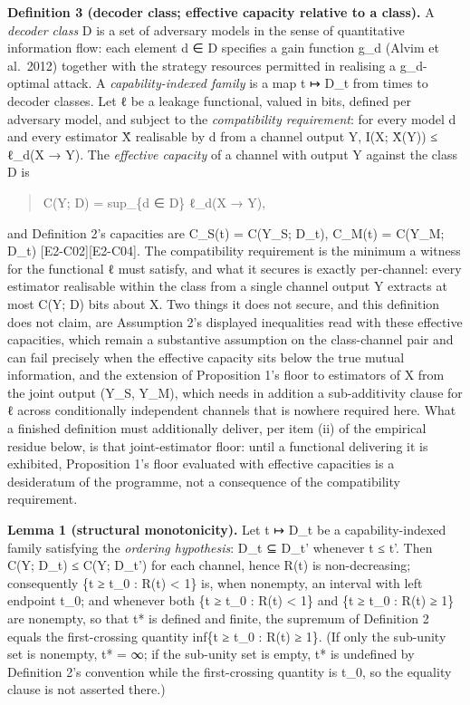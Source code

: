 \documentclass[
  11pt,
]{article}
\begin{document}
\textbf{Definition 3 (decoder class; effective capacity relative to a
class).} A \emph{decoder class} D is a set of adversary models in the
sense of quantitative information flow: each element d ∈ D specifies a
gain function g\_d (Alvim et al.~2012) together with the strategy
resources permitted in realising a g\_d-optimal attack. A
\emph{capability-indexed family} is a map t ↦ D\_t from times to decoder
classes. Let ℓ be a leakage functional, valued in bits, defined per
adversary model, and subject to the \emph{compatibility requirement}:
for every model d and every estimator X̂ realisable by d from a channel
output Y, I(X; X̂(Y)) ≤ ℓ\_d(X → Y). The \emph{effective capacity} of a
channel with output Y against the class D is

\begin{quote}
C(Y; D) = sup\_\{d ∈ D\} ℓ\_d(X → Y),
\end{quote}

and Definition 2's capacities are C\_S(t) = C(Y\_S; D\_t), C\_M(t) =
C(Y\_M; D\_t) {[}E2-C02{]}{[}E2-C04{]}. The compatibility requirement is
the minimum a witness for the functional ℓ must satisfy, and what it
secures is exactly per-channel: every estimator realisable within the
class from a single channel output Y extracts at most C(Y; D) bits about
X. Two things it does not secure, and this definition does not claim,
are Assumption 2's displayed inequalities read with these effective
capacities, which remain a substantive assumption on the class-channel
pair and can fail precisely when the effective capacity sits below the
true mutual information, and the extension of Proposition 1's floor to
estimators of X from the joint output (Y\_S, Y\_M), which needs in
addition a sub-additivity clause for ℓ across conditionally independent
channels that is nowhere required here. What a finished definition must
additionally deliver, per item (ii) of the empirical residue below, is
that joint-estimator floor: until a functional delivering it is
exhibited, Proposition 1's floor evaluated with effective capacities is
a desideratum of the programme, not a consequence of the compatibility
requirement.

\textbf{Lemma 1 (structural monotonicity).} Let t ↦ D\_t be a
capability-indexed family satisfying the \emph{ordering hypothesis}:
D\_t ⊆ D\_t' whenever t ≤ t'. Then C(Y; D\_t) ≤ C(Y; D\_t') for each
channel, hence R(t) is non-decreasing; consequently \{t ≥ t\_0 : R(t)
\textless{} 1\} is, when nonempty, an interval with left endpoint t\_0;
and whenever both \{t ≥ t\_0 : R(t) \textless{} 1\} and \{t ≥ t\_0 :
R(t) ≥ 1\} are nonempty, so that t* is defined and finite, the supremum
of Definition 2 equals the first-crossing quantity inf\{t ≥ t\_0 : R(t)
≥ 1\}. (If only the sub-unity set is nonempty, t* = ∞; if the sub-unity
set is empty, t* is undefined by Definition 2's convention while the
first-crossing quantity is t\_0, so the equality clause is not asserted
there.)
\end{document}
